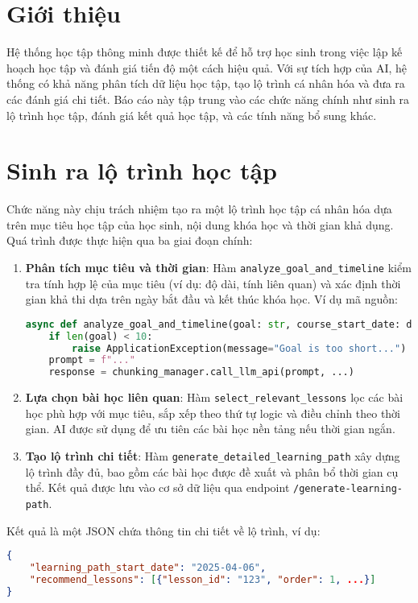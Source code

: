 \section{Giới thiệu}
Hệ thống học tập thông minh được thiết kế để hỗ trợ học sinh trong việc lập kế hoạch học tập và đánh giá tiến độ một cách hiệu quả. Với sự tích hợp của AI, hệ thống có khả năng phân tích dữ liệu học tập, tạo lộ trình cá nhân hóa và đưa ra các đánh giá chi tiết. Báo cáo này tập trung vào các chức năng chính như sinh ra lộ trình học tập, đánh giá kết quả học tập, và các tính năng bổ sung khác.

\section{Sinh ra lộ trình học tập}
Chức năng này chịu trách nhiệm tạo ra một lộ trình học tập cá nhân hóa dựa trên mục tiêu học tập của học sinh, nội dung khóa học và thời gian khả dụng. Quá trình được thực hiện qua ba giai đoạn chính:

\begin{enumerate}
    \item \textbf{Phân tích mục tiêu và thời gian}: Hàm \texttt{analyze\_goal\_and\_timeline} kiểm tra tính hợp lệ của mục tiêu (ví dụ: độ dài, tính liên quan) và xác định thời gian khả thi dựa trên ngày bắt đầu và kết thúc khóa học. Ví dụ mã nguồn:
    \begin{lstlisting}[language=Python]
async def analyze_goal_and_timeline(goal: str, course_start_date: datetime, ...):
    if len(goal) < 10:
        raise ApplicationException(message="Goal is too short...")
    prompt = f"..."
    response = chunking_manager.call_llm_api(prompt, ...)
    \end{lstlisting}

    \item \textbf{Lựa chọn bài học liên quan}: Hàm \texttt{select\_relevant\_lessons} lọc các bài học phù hợp với mục tiêu, sắp xếp theo thứ tự logic và điều chỉnh theo thời gian. AI được sử dụng để ưu tiên các bài học nền tảng nếu thời gian ngắn.

    \item \textbf{Tạo lộ trình chi tiết}: Hàm \texttt{generate\_detailed\_learning\_path} xây dựng lộ trình đầy đủ, bao gồm các bài học được đề xuất và phân bổ thời gian cụ thể. Kết quả được lưu vào cơ sở dữ liệu qua endpoint \texttt{/generate-learning-path}.
\end{enumerate}

Kết quả là một JSON chứa thông tin chi tiết về lộ trình, ví dụ:
\begin{lstlisting}[language=JSON]
{
    "learning_path_start_date": "2025-04-06",
    "recommend_lessons": [{"lesson_id": "123", "order": 1, ...}]
}
\end{lstlisting}

